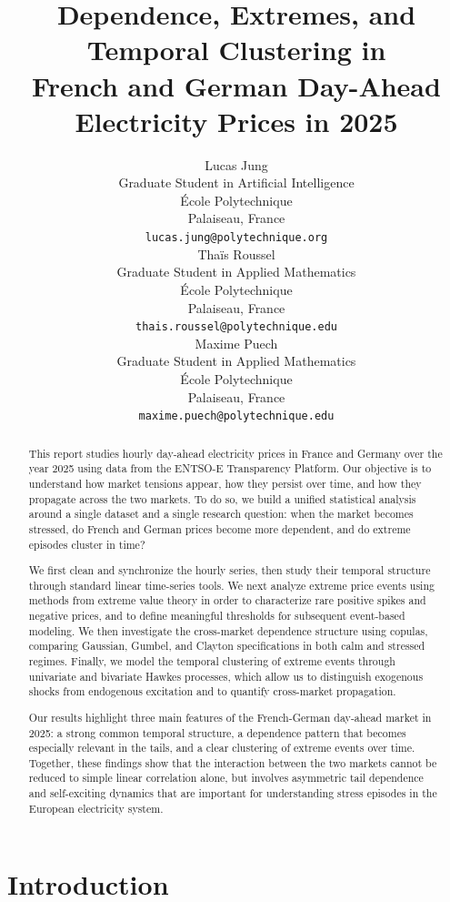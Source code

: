 \documentclass[11pt, a4paper]{article}
\title{Dependence, Extremes, and Temporal Clustering in\\
French and German Day-Ahead Electricity Prices in 2025}
\author{
    Lucas Jung \\
    Graduate Student in Artificial Intelligence \\
    École Polytechnique \\
    Palaiseau, France \\
    \texttt{lucas.jung@polytechnique.org} \\
    \And
    Thaïs Roussel \\
    Graduate Student in Applied Mathematics \\
    École Polytechnique \\
    Palaiseau, France \\
    \texttt{thais.roussel@polytechnique.edu} \\
    \And
    Maxime Puech \\
    Graduate Student in Applied Mathematics \\
    École Polytechnique \\
    Palaiseau, France \\
    \texttt{maxime.puech@polytechnique.edu} \\
}
\theoremstyle{remark}
\begin{document}
\maketitle
\pagestyle{main}

\begin{abstract}
This report studies hourly day-ahead electricity prices in France and Germany over the year 2025 using data from the ENTSO-E Transparency Platform. Our objective is to understand how market tensions appear, how they persist over time, and how they propagate across the two markets. To do so, we build a unified statistical analysis around a single dataset and a single research question: when the market becomes stressed, do French and German prices become more dependent, and do extreme episodes cluster in time?

We first clean and synchronize the hourly series, then study their temporal structure through standard linear time-series tools. We next analyze extreme price events using methods from extreme value theory in order to characterize rare positive spikes and negative prices, and to define meaningful thresholds for subsequent event-based modeling. We then investigate the cross-market dependence structure using copulas, comparing Gaussian, Gumbel, and Clayton specifications in both calm and stressed regimes. Finally, we model the temporal clustering of extreme events through univariate and bivariate Hawkes processes, which allow us to distinguish exogenous shocks from endogenous excitation and to quantify cross-market propagation.

Our results highlight three main features of the French-German day-ahead market in 2025: a strong common temporal structure, a dependence pattern that becomes especially relevant in the tails, and a clear clustering of extreme events over time. Together, these findings show that the interaction between the two markets cannot be reduced to simple linear correlation alone, but involves asymmetric tail dependence and self-exciting dynamics that are important for understanding stress episodes in the European electricity system.
\end{abstract}

\section{Introduction}
\label{sec:intro}

\end{document}
